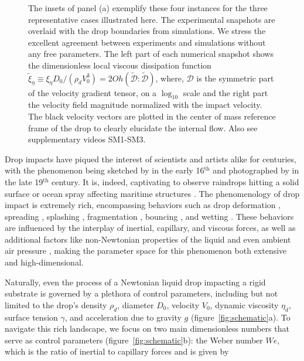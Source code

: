 \documentclass{jfm}
\newcommand{\bb}{\color{black} \normalfont}
\begin{document}
\begin{figure}
{{	The insets of panel (a) exemplify these four instances for the three representative cases illustrated here. The experimental snapshots are overlaid with the drop boundaries from simulations. 
	We stress the excellent agreement between experiments and simulations without any free parameters.
	The left part of each numerical snapshot shows the dimensionless local viscous dissipation function $\tilde{\xi}_\eta \equiv \xi_\eta D_0/\left(\rho_dV_0^3\right) = 2Oh\left(\boldsymbol{\tilde{\mathcal{D}}:\tilde{\mathcal{D}}}\right)$, where, $\boldsymbol{\mathcal{D}}$ is the symmetric part of the velocity gradient tensor, on a $\log_{10}$ scale and the right part the velocity field magnitude normalized with the impact velocity. The black velocity vectors are plotted in the center of mass reference frame of the drop to clearly elucidate the internal flow.  Also see supplementary videos SM1-SM3.\bb}}
\label{fig:summary}
\end{figure}

Drop impacts have piqued the interest of scientists and artists alike for centuries, with the phenomenon being sketched by \citet{da1508notebooks} in the early 16$^{\text{th}}$ and photographed by \citet{worthington1876, worthington1876b} in the late 19$^{\text{th}}$ century. It is, indeed, captivating to observe raindrops hitting a solid surface \citep{kim2020raindrop, lohse-2020-pnas} or ocean spray affecting maritime structures \citep{berny2021statistics, villermaux2022bubbles}. The phenomenology of drop impact is extremely rich, encompassing behaviors such as drop deformation \citep{Biance2006, molavcek2012quasi, chevy2012liquid}, spreading \citep{laan2014maximum, Wildeman2016}, splashing \cite{xu2005drop, riboux2014experiments, thoraval2021nanoscopic}, fragmentation \citep{villermaux2011drop, villermaux2020fragmentation}, bouncing \citep{Richard2000, kolinski-2014-epl, Jha2020, chubynsky-2020-prl, sharma-2021-jfm, sanjay_chantelot_lohse_2023}, and wetting \citep{degennes-1985-rmp, fukai-1995-pof, quere-2008-arms, Bonn2009}. These behaviors are influenced by the interplay of inertial, capillary, and viscous forces, as well as additional factors like non-Newtonian properties \citep{bartolo2005retraction, bartolo2007dynamics,  smith-2010-prl, gorin-2022-langmuir} of the liquid and even ambient air pressure \citep{xu2005drop}, making the parameter space for this phenomenon both extensive and high-dimensional. 

Naturally, even the process of a Newtonian liquid drop impacting a rigid substrate is governed by a plethora of control parameters, including but not limited to the drop's density $\rho_d$, diameter $D_0$, velocity $V_0$, dynamic viscosity $\eta_d$, surface tension $\gamma$, and acceleration due to gravity $g$ (figure~\ref{fig:schematic}a). 
To navigate this rich landscape, we focus on two main dimensionless numbers that serve as control parameters (figure~\ref{fig:schematic}b): the Weber number $We$, which is the ratio of inertial to capillary forces and is given by
\end{document}
